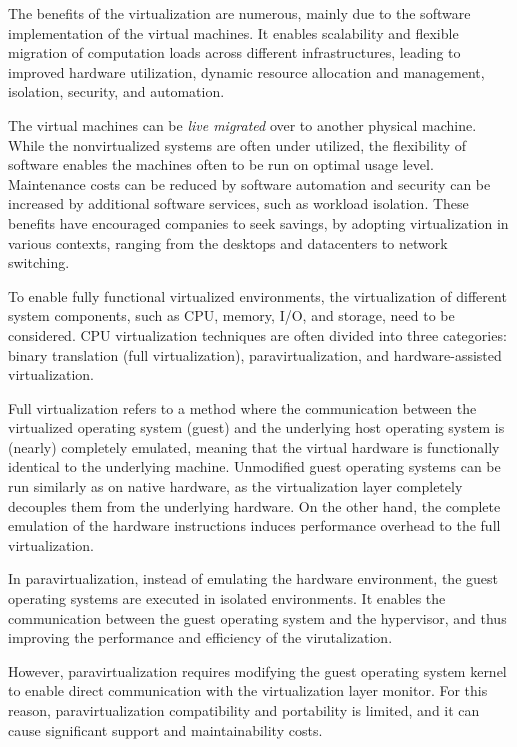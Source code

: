 The benefits of the virtualization are numerous, mainly due to the software implementation of the virtual machines. It enables scalability and flexible migration of computation loads across different infrastructures, leading to improved hardware utilization, dynamic resource allocation and management, isolation, security, and automation.~\cite{Pearce:2013:VIS}

The virtual machines can be \emph{live migrated} over to another physical machine. While the nonvirtualized systems are often under utilized, the flexibility of software enables the machines often to be run on optimal usage level. Maintenance costs can be reduced by software automation and security can be increased by additional software services, such as workload isolation. These benefits have encouraged companies to seek savings, by adopting virtualization in various contexts, ranging from the desktops and datacenters to network switching.~\cite{Uhlig:2005:IVT, Pearce:2013:VIS}

To enable fully functional virtualized environments, the virtualization of different system components, such as CPU, memory, I/O, and storage, need to be considered. CPU virtualization techniques are often divided into three categories: binary translation (full virtualization), paravirtualization, and hardware-assisted virtualization.~\cite{Bugnion:2012:BVX, Pearce:2013:VIS, Horne:2007:Understanding}

Full virtualization refers to a method where the communication between the virtualized operating system (guest) and the underlying host operating system is (nearly) completely emulated, meaning that the virtual hardware is functionally identical to the underlying machine. Unmodified guest operating systems can be run similarly as on native hardware, as the virtualization layer completely decouples them from the underlying hardware. On the other hand, the complete emulation of the hardware instructions induces performance overhead to the full virtualization.~\cite{Bugnion:2012:BVX, Barham:2003:XAV, Horne:2007:Understanding}

In paravirtualization, instead of emulating the hardware environment, the guest operating systems are executed in isolated environments. It enables the communication between the guest operating system and the hypervisor, and thus improving the performance and efficiency of the virutalization.~\cite{Barham:2003:XAV, Horne:2007:Understanding}

However, paravirtualization requires modifying the guest operating system kernel to enable direct communication with the virtualization layer monitor. For this reason, paravirtualization compatibility and portability is limited, and it can cause significant support and maintainability costs.~\cite{Barham:2003:XAV, Horne:2007:Understanding}

